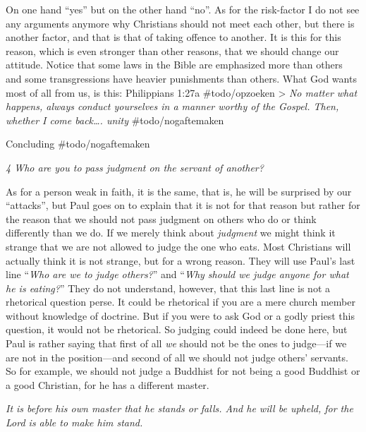 On one hand ``yes'' but on the other hand ``no''. As for the risk-factor
I do not see any arguments anymore why Christians should not meet each
other, but there is another factor, and that is that of taking offence
to another. It is this for this reason, which is even stronger than
other reasons, that we should change our attitude. Notice that some laws
in the Bible are emphasized more than others and some transgressions
have heavier punishments than others. What God wants most of all from
us, is this: Philippians 1:27a \#todo/opzoeken \textgreater{} \emph{No
matter what happens, always conduct yourselves in a manner worthy of the
Gospel. Then, whether I come back\ldots. unity} \#todo/nogaftemaken

Concluding \#todo/nogaftemaken

\emph{4 Who are you to pass judgment on the servant of another?}

As for a person weak in faith, it is the same, that is, he will be
surprised by our ``attacks'', but Paul goes on to explain that it is not
for that reason but rather for the reason that we should not pass
judgment on others who do or think differently than we do. If we merely
think about \emph{judgment} we might think it strange that we are not
allowed to judge the one who eats. Most Christians will actually think
it is not strange, but for a wrong reason. They will use Paul's last
line ``\emph{Who are we to judge others?}'' and ``\emph{Why should we
judge anyone for what he is eating?}'' They do not understand, however,
that this last line is not a rhetorical question perse. It could be
rhetorical if you are a mere church member without knowledge of
doctrine. But if you were to ask God or a godly priest this question, it
would not be rhetorical. So judging could indeed be done here, but Paul
is rather saying that first of all \emph{we} should not be the ones to
judge---if we are not in the position---and second of all we should not
judge others' servants. So for example, we should not judge a Buddhist
for not being a good Buddhist or a good Christian, for he has a
different master.

\emph{It is before his own master that he stands or falls. And he will
be upheld, for the Lord is able to make him stand.}

